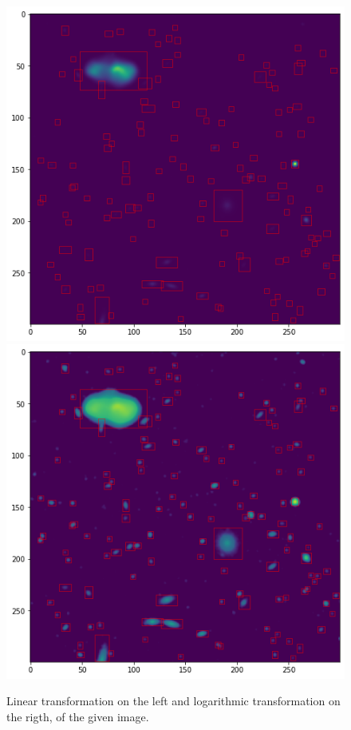 \documentclass[a4paper,10pt]{report}
\begin{document}
\begin{figure}[!htb]
    \includegraphics[width=\linewidth]{RGB_linear.png}
  \endminipage\hfill
    \includegraphics[width=\linewidth]{RGB_log.png}
  \endminipage\hfill
  \caption{Linear transformation on the left and logarithmic transformation on the rigth, of the given image.}
  \label{fig:image_transf}
\end{figure}
\end{document}
